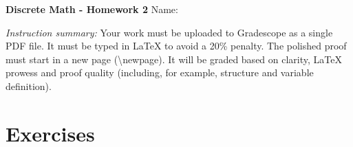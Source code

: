 \documentclass[12pt]{article}
\begin{document}
\begin{center}
 \LARGE{ \textbf{Discrete Math - Homework 2}} \Large \newline
    Name:
\end{center}

\vspace{1em}

\noindent \emph{Instruction summary:} Your work must be uploaded to Gradescope as a single PDF file. It must be typed in LaTeX to avoid a 20\% penalty. The polished proof must start in a new page (\textbackslash{newpage}). It will be graded based on clarity, LaTeX prowess and proof quality (including, for example, structure and variable definition).

\section*{Exercises}
\end{document}
